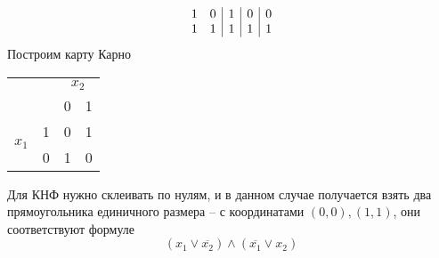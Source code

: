 \begin{enumerate}
\begin{solution}
\begin{displaymath}
\begin{array}{c c|c|c|c}
        1 & 0 & 1 & 0 & 0\\
        1 & 1 & 1 & 1 & 1\\
      \end{array}
    \end{displaymath}
    Построим карту Карно
    \begin{table}[h!]
      \centering
      \begin{tabular}{cc|cc|}
      \cline{3-4}
      \multicolumn{2}{c|}{\multirow{2}{*}{}} & \multicolumn{2}{c|}{$x_2$} \\ \cline{3-4} 
      \multicolumn{2}{c|}{} & \multicolumn{1}{c|}{0} & 1 \\ \hline
      \multicolumn{1}{|c|}{\multirow{2}{*}{$x_1$}} & 1 & \multicolumn{1}{c|}{0} & 1 \\ \cline{2-4} 
      \multicolumn{1}{|c|}{} & 0 & \multicolumn{1}{c|}{1} & 0 \\ \hline
      \end{tabular}
    \end{table}

    Для КНФ нужно склеивать по нулям, и в данном случае получается взять два прямоугольника единичного размера -- с координатами $(0,0), (1,1)$, они соответствуют формуле
    \begin{equation}
      (x_1 \lor \overline{x_2}) \land (\overline{x_1} \lor x_2)
    \end{equation}
  \end{solution}
  
\end{enumerate}

\clearpage
